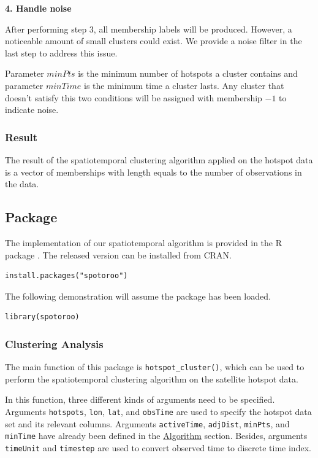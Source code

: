 \textbf{4. Handle noise}

After performing step 3, all membership labels will be produced.
However, a noticeable amount of small clusters could exist. We provide a
noise filter in the last step to address this issue.

Parameter \(minPts\) is the minimum number of hotspots a cluster
contains and parameter \(minTime\) is the minimum time a cluster lasts.
Any cluster that doesn't satisfy this two conditions will be assigned
with membership \(-1\) to indicate noise.

\hypertarget{result}{%
\subsubsection{Result}\label{result}}

The result of the spatiotemporal clustering algorithm applied on the
hotspot data is a vector of memberships with length equals to the number
of observations in the data.

\hypertarget{package}{%
\subsection{Package}\label{package}}

The implementation of our spatiotemporal algorithm is provided in the R
package . The released version can be installed from
CRAN.

\begin{verbatim}
install.packages("spotoroo")
\end{verbatim}

The following demonstration will assume the package 
has been loaded.

\begin{verbatim}
library(spotoroo)
\end{verbatim}

\hypertarget{clustering-analysis}{%
\subsubsection{Clustering Analysis}\label{clustering-analysis}}

The main function of this package is \texttt{hotspot\_cluster()}, which
can be used to perform the spatiotemporal clustering algorithm on the
satellite hotspot data.

In this function, three different kinds of arguments need to be
specified. Arguments \texttt{hotspots}, \texttt{lon}, \texttt{lat}, and
\texttt{obsTime} are used to specify the hotspot data set and its
relevant columns. Arguments \texttt{activeTime}, \texttt{adjDist},
\texttt{minPts}, and \texttt{minTime} have already been defined in the
\protect\hyperlink{algorithm}{Algorithm} section. Besides, arguments
\texttt{timeUnit} and \texttt{timestep} are used to convert observed
time to discrete time index.

